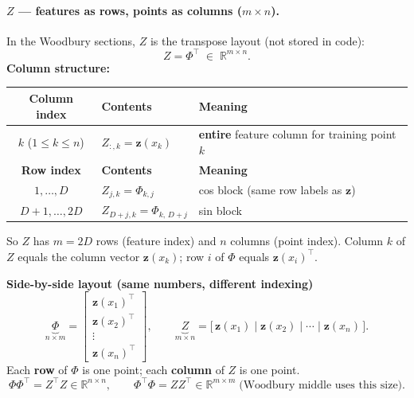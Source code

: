 \documentclass[11pt]{article}
\newcommand{\Ph}{\Phi}
\newcommand{\Zmat}{Z}
\begin{document}
\paragraph{$\Zmat$ --- features as \textbf{rows}, points as \textbf{columns} ($m \times n$).}
In the Woodbury sections, $\Zmat$ is the transpose layout (not stored in code):
\[
  \Zmat = \Ph^{\top} \;\in\; \mathbb{R}^{m \times n}.
\]
\textbf{Column structure:}
\begin{center}
\renewcommand{\arraystretch}{1.25}
\begin{tabular}{@{}cll@{}}
\toprule
\textbf{Column index} & \textbf{Contents} & \textbf{Meaning} \\
\midrule
$k$ ($1\le k\le n$) &
$\Zmat_{:,k} = \mathbf z(x_k)$ &
\textbf{entire} feature column for training point $k$ \\
\midrule
\textbf{Row index} & \textbf{Contents} & \textbf{Meaning} \\
\midrule
$1,\ldots,D$ &
$\Zmat_{j,k} = \Ph_{k,j}$ &
cos block (same row labels as $\mathbf z$) \\
$D{+}1,\ldots,2D$ &
$\Zmat_{D+j,k} = \Ph_{k,\,D+j}$ &
sin block \\
\bottomrule
\end{tabular}
\end{center}
So $\Zmat$ has $m=2D$ rows (feature index) and $n$ columns (point index).
Column $k$ of $\Zmat$ equals the column vector $\mathbf z(x_k)$; row $i$ of $\Ph$ equals $\mathbf z(x_i)^{\top}$.

\begin{samebox}
\textbf{Side-by-side layout (same numbers, different indexing)}
\[
  \underbrace{\Ph}_{n \times m}
  =
  \begin{bmatrix}
    \mathbf z(x_1)^{\top} \\
    \mathbf z(x_2)^{\top} \\
    \vdots \\
    \mathbf z(x_n)^{\top}
  \end{bmatrix},
  \qquad
  \underbrace{\Zmat}_{m \times n}
  =
  \bigl[\,\mathbf z(x_1)\;\big|\;\mathbf z(x_2)\;\big|\;\cdots\;\big|\;\mathbf z(x_n)\,\bigr].
\]
Each \textbf{row} of $\Ph$ is one point; each \textbf{column} of $\Zmat$ is one point.
\[
  \Ph\Ph^{\top} = \Zmat^{\top}\Zmat \in \mathbb{R}^{n \times n},
  \qquad
  \Ph^{\top}\Ph = \Zmat\Zmat^{\top} \in \mathbb{R}^{m \times m} \;\text{(Woodbury middle uses this size)}.
\]
\end{samebox}
\end{document}
